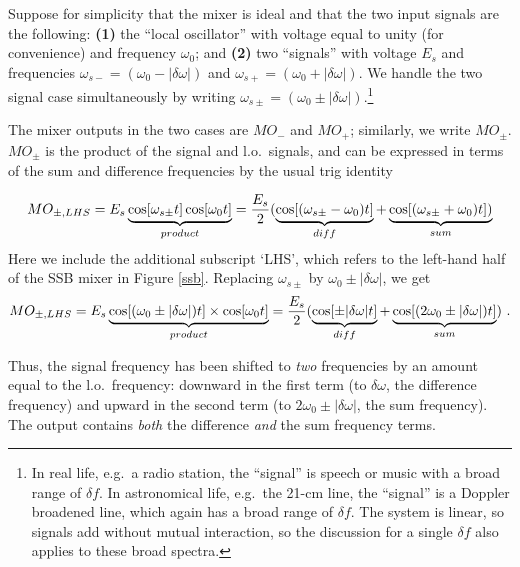 \documentclass[12pt,preprint]{aastex}
\begin{document}
        Suppose for simplicity that the mixer is ideal and that the two
input signals are the following: {\bf (1)} the ``local oscillator'' with
voltage equal to unity (for convenience) and frequency $\omega_0$; and
{\bf (2)} two ``signals'' with voltage $E_s$ and frequencies
$\omega_{s-} = (\omega_0 - |\delta \omega |)$ and $\omega_{s+} =
(\omega_0 + |\delta \omega |)$. We handle the two signal case
simultaneously by writing $\omega_{s \pm} = (\omega_0 \pm |\delta \omega
|)$.\footnote{In real life, e.g.\ a radio station, the ``signal'' is
speech or music with a broad range of $\delta f$. In astronomical life,
e.g.\ the 21-cm line, the ``signal'' is a Doppler broadened line, which
again has a broad range of $\delta f$. The system is linear, so signals
add without mutual interaction, so the discussion for a single $\delta
f$ also applies to these broad spectra.}

        The mixer outputs in the two cases are $MO_-$ and $MO_+$;
similarly, we write $MO_{\pm}$. $MO_{\pm}$ is the product of the signal and
l.o.~signals, and can be expressed in terms of the sum and difference
frequencies by the usual trig identity
%
\begin{mathletters} \label{eqn4}
\begin{equation} \label{eqn4a}
MO_{\pm,LHS} = E_s \underbrace{\cos [\omega_{s \pm} t] \cos [\omega_0 t]
}_{product} =
        {E_s \over 2} (\underbrace {\cos [(\omega_{s\pm} - \omega_0)t
	]}_{diff} +
        \underbrace { \cos [(\omega_{s\pm} + \omega_0)t]) }_{sum}
\end{equation}
%
\noindent Here we include the additional subscript `LHS', which refers to
the left-hand half of the SSB mixer in Figure \ref{ssb}. Replacing
$\omega_{s\pm}$ by $\omega_0 \pm |\delta \omega|$, we get
%
\begin{equation} \label{mopm} \label{eqn4b}
MO_{\pm, LHS} = E_s \underbrace{\cos [(\omega_0 \pm |\delta \omega |)t]
\times
\cos [\omega_0 t]}_{product} = {E_s \over 2}
        (\underbrace{ \cos [\pm|\delta \omega | t]}_{diff} +
        \underbrace{ \cos[(2\omega_0 \pm |\delta \omega |) t]}_{sum} ) \
.
\end{equation}
\end{mathletters}
%
\noindent Thus, the signal frequency has been shifted to {\it two}
frequencies by an amount equal to the l.o.\ frequency:  downward in the
first term (to $\delta \omega $, the difference frequency) and upward
in the second term (to $2\omega_0 \pm |\delta \omega |$, the sum
frequency).  The output contains {\it both} the difference {\it and} the
sum frequency terms.
\end{document}
